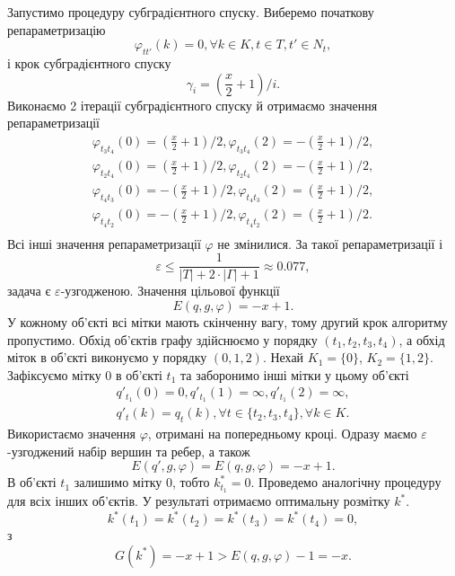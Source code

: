 Запустимо процедуру субградієнтного спуску. Виберемо початкову репараметризацію
\begin{equation*}
    \varphi_{tt'}(k)=0,\forall k\in K, t\in T, t'\in N_t,
\end{equation*}
і крок субградієнтного спуску 
\begin{equation*}
    \gamma_i=\left(\frac{x}{2}+1\right)/i.
\end{equation*}
Виконаємо 2 ітерації субградієнтного спуску й отримаємо значення репараметризації 
\begin{equation*}
    \begin{aligned}
       \varphi_{t_3t_4}(0)=\left(\frac{x}{2}+1\right)/2, \varphi_{t_3t_4}(2)=-\left(\frac{x}{2}+1\right)/2,\\
       \varphi_{t_2t_4}(0)=\left(\frac{x}{2}+1\right)/2, \varphi_{t_2t_4}(2)=-\left(\frac{x}{2}+1\right)/2,\\
       \varphi_{t_4t_3}(0)=-\left(\frac{x}{2}+1\right)/2, \varphi_{t_4t_3}(2)=\left(\frac{x}{2}+1\right)/2,\\
       \varphi_{t_4t_2}(0)=-\left(\frac{x}{2}+1\right)/2, \varphi_{t_4t_2}(2)=\left(\frac{x}{2}+1\right)/2.\\
    \end{aligned}
\end{equation*}
Всі інші значення репараметризації $\varphi$ не змінилися. За такої репараметризації і 
\begin{equation*}
    \varepsilon\leq \frac{1}{|T|+2\cdot|\Gamma|+1}\approx 0.077,
\end{equation*}
задача є $\varepsilon$-узгодженою.
Значення цільової функції 
\begin{equation*}
    E(q,g,\varphi)=-x+1.
\end{equation*}
У кожному об'єкті всі мітки мають скінченну вагу, тому другий крок алгоритму пропустимо.
Обхід об'єктів графу здійснюємо у порядку $(t_1,t_2,t_3,t_4)$, а обхід міток в 
об'єкті виконуємо у порядку $(0,1,2)$. Нехай $K_1=\{0\}$, $K_2=\{1,2\}$. Зафіксуємо мітку $0$ в 
об'єкті $t_1$ та заборонимо інші мітки у цьому об'єкті
\begin{equation*}
    \begin{aligned}
    q'_{t_1}(0)=0,q'_{t_1}(1)=\infty,q'_{t_1}(2)=\infty,\\
    q'_t(k)=q_t(k),\forall t\in \{t_2,t_3,t_4\}, \forall k\in K.
    \end{aligned}
\end{equation*}
Використаємо значення $\varphi$, отримані на попередньому кроці. Одразу маємо 
$\varepsilon$-узгоджений набір вершин та ребер, а також 
\begin{equation*}
    E(q',g,\varphi)=E(q,g,\varphi)=-x+1.
\end{equation*}
В об'єкті $t_1$ залишимо мітку $0$, тобто $k^*_{t_1}=0$. Проведемо аналогічну процедуру 
для всіх інших об'єктів. У результаті отримаємо оптимальну розмітку $k^*$.
\begin{equation*}
    k^*(t_1)=k^*(t_2)=k^*(t_3)=k^*(t_4)=0,
\end{equation*}
з
\begin{equation*}
    G(k^*)=-x+1>E(q,g,\varphi)-1=-x.
\end{equation*}

